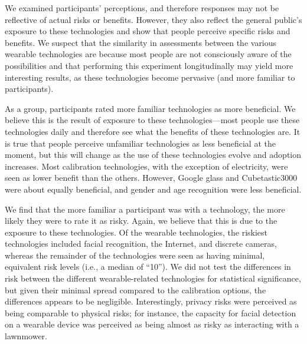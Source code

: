 We examined participants' perceptions, and therefore responses may not be reflective of actual risks or benefits. However, they also reflect the general public's exposure to these technologies and show that people perceive specific risks and benefits. We suspect that the similarity in assessments between the various wearable technologies are because most people are not consciously aware of the possibilities and that performing this experiment longitudinally may yield more interesting results, as these technologies become pervasive (and more familiar to participants).

As a group, participants rated more familiar technologies as more beneficial. We believe this is the result of exposure to these technologies---most people use these technologies daily and therefore see what the benefits of these technologies are. It is true that people perceive unfamiliar technologies as less beneficial at the moment, but this will change as the use of these technologies evolve and adoption increases. Most calibration technologies, with the exception of electricity, were seen as lower benefit than the others. However, Google glass and Cubetastic3000 were about equally beneficial, and gender and age recognition were less beneficial. 

We find that the more familiar a participant was with a technology, the more likely they were to rate it as risky.  Again, we believe that this is due to the exposure to these technologies. Of the wearable technologies, the riskiest technologies included facial recognition, the Internet, and discrete cameras, whereas the remainder of the technologies were seen as having minimal, equivalent risk levels (i.e., a median of ``10''). We did not test the differences in risk between the different wearable-related technologies for statistical significance, but given their minimal spread compared to the calibration options, the differences appears to be negligible. Interestingly, privacy risks were perceived as being comparable to physical risks; for instance, the capacity for facial detection on a wearable device was perceived as being almost as risky as interacting with a lawnmower. 